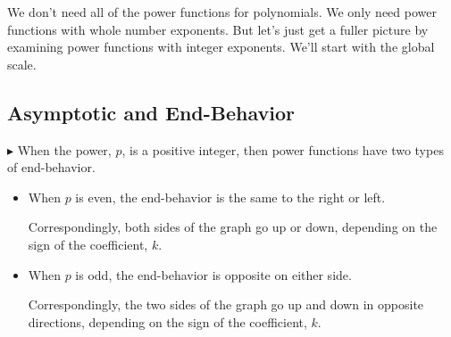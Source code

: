 \documentclass{ximera}
\begin{document}
We don't need all of the power functions for polynomials.  We only need power functions with whole number exponents. But let's just get a fuller picture by examining power functions with integer exponents. We'll start with the global scale.\\





\subsection{Asymptotic and End-Behavior}



$\blacktriangleright$  When the power, $p$, is a positive integer, then power functions have two types of end-behavior.

\begin{itemize}
\item When $p$ is even, the end-behavior is the same to the right or left.


Correspondingly, both sides of the graph go up or down, depending on the sign of the coefficient, $k$.


\item When $p$ is odd, the end-behavior is opposite on either side.


Correspondingly, the two sides of the graph go up and down in opposite directions, depending on the sign of the coefficient, $k$.




\end{itemize}
\end{document}
